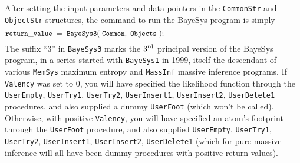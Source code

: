 \vfill\eject
{}
\bigskip

After setting the input parameters and data pointers in the {\tt CommonStr} and {\tt ObjectStr} structures, the command to run the BayeSys program is simply
$$
    {\tt return\_value\ =\ BayeSys3(\ Common,\ Objects\ );}\qquad\qquad\qquad\qquad\qquad\qquad\qquad\qquad\qquad\quad
$$
The suffix ``3'' in {\tt BayeSys3} marks the $3^{\rm rd}$ principal version of the BayeSys program, in a series started with {\tt BayeSys1} in 1999,
itself the descendant of various {\tt MemSys} maximum entropy and {\tt MassInf} massive inference programs.
If {\tt Valency} was set to 0, you will have specified the likelihood function through the 
{\tt UserEmpty}, {\tt UserTry1}, {\tt UserTry2}, {\tt UserInsert1}, {\tt UserInsert2}, {\tt UserDelete1} procedures, 
and also supplied a dummy {\tt UserFoot} (which won't be called).
Otherwise, with positive {\tt Valency}, you will have specified an atom's footprint through the {\tt UserFoot} procedure, 
and also supplied {\tt UserEmpty}, {\tt UserTry1}, {\tt UserTry2}, {\tt UserInsert1}, {\tt UserInsert2}, {\tt UserDelete1}
(which for pure massive inference will all have been dummy procedures with positive return values).
